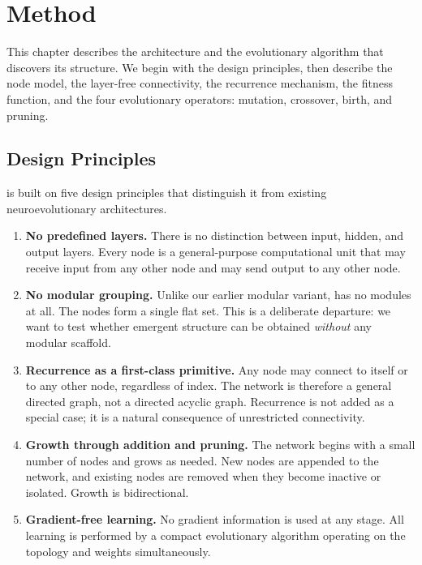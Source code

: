 
\chapter{Method}
\label{ch:method}

This chapter describes the \modnet{} architecture and the evolutionary
algorithm that discovers its structure. We begin with the design
principles, then describe the node model, the layer-free connectivity,
the recurrence mechanism, the fitness function, and the four
evolutionary operators: mutation, crossover, birth, and pruning.

\section{Design Principles}
\label{sec:method-principles}

\modnet{} is built on five design principles that distinguish it from
existing neuroevolutionary architectures.

\begin{enumerate}
  \item \textbf{No predefined layers.} There is no distinction between
    input, hidden, and output layers. Every node is a general-purpose
    computational unit that may receive input from any other node and
    may send output to any other node.

  \item \textbf{No modular grouping.} Unlike our earlier modular variant,
    \modnet{} has no modules at all. The nodes form a single flat set.
    This is a deliberate departure: we want to test whether emergent
    structure can be obtained \emph{without} any modular scaffold.

  \item \textbf{Recurrence as a first-class primitive.} Any node may
    connect to itself or to any other node, regardless of index. The
    network is therefore a general directed graph, not a directed acyclic
    graph. Recurrence is not added as a special case; it is a natural
    consequence of unrestricted connectivity.

  \item \textbf{Growth through addition and pruning.} The network begins
    with a small number of nodes and grows as needed. New nodes are
    appended to the network, and existing nodes are removed when they
    become inactive or isolated. Growth is bidirectional.

  \item \textbf{Gradient-free learning.} No gradient information is used
    at any stage. All learning is performed by a compact evolutionary
    algorithm operating on the topology and weights simultaneously.
\end{enumerate}


